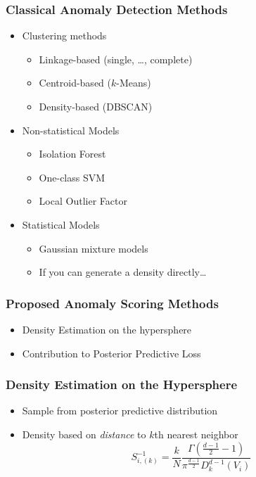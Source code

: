 \documentclass[aspectratio=169]{beamer}
\begin{document}
\begin{frame}
  \frametitle{Classical Anomaly Detection Methods}
  \begin{itemize}
    \item Clustering methods
      \begin{itemize}
        \item Linkage-based (single, \dots, complete)
        \item Centroid-based ($k$-Means)
        \item Density-based (DBSCAN)
      \end{itemize}
    \item Non-statistical Models
      \begin{itemize}
        \item Isolation Forest
        \item One-class SVM
        \item Local Outlier Factor
      \end{itemize}
    \item Statistical Models
      \begin{itemize}
        \item Gaussian mixture models
        \item If you can generate a density directly\dots
      \end{itemize}
  \end{itemize}
\end{frame}

\begin{frame}
  \frametitle{Proposed Anomaly Scoring Methods}
  \begin{itemize}
    \item Density Estimation on the hypersphere
    \item Contribution to Posterior Predictive Loss
  \end{itemize}
\end{frame}

\begin{frame}
  \frametitle{Density Estimation on the Hypersphere}
  \begin{itemize}
    \item Sample from posterior predictive distribution
    \item Density based on \emph{distance} to $k$th nearest neighbor
    \begin{equation}
        S_{i,(k)}^{-1} =
          \frac{k}{N}\frac{\Gamma\left(\frac{d-1}{2} - 1\right)}{\pi^{\frac{d-1}{2}}D_{k}^{d-1}(V_i)}
    \end{equation}
  \end{itemize}
\end{frame}
\end{document}
